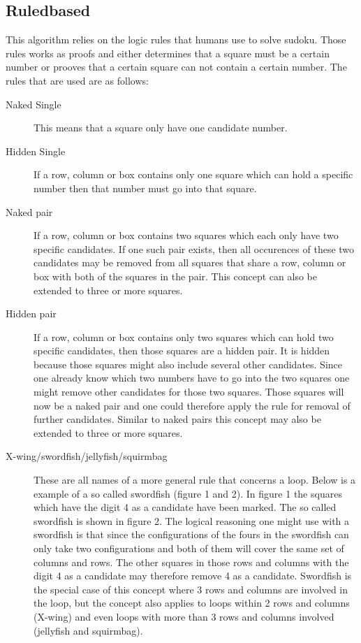 \documentclass[a4paper,11pt]{kth-mag}
\begin{document}
\subsection{Ruledbased}
This algorithm relies on the logic rules that humans use to solve sudoku. Those rules works as proofs and either determines that a square must be a certain number or prooves that a certain square can not contain a certain number. The rules that are used are as follows:
\begin{description}
    \item[Naked Single] 
    This means that a square only have one candidate number.
    \item[Hidden Single] 
    If a row, column or box contains only one square which can hold a specific number then that number must go into that square.
    \item[Naked pair] 
    If a row, column or box contains two squares which each only have two specific candidates. If one such pair exists, then all occurences of these two candidates may be removed from all squares that share a row, column or box with both of the squares in the pair. This concept can also be extended to three or more squares.
    \item[Hidden pair]
    If a row, column or box contains only two squares which can hold two specific candidates, then those squares are a hidden pair. It is hidden because those squares might also include several other candidates. Since one already know which two numbers have to go into the two squares one might remove other candidates for those two squares. Those squares will now be a naked pair and one could therefore apply the rule for removal of further candidates. Similar to naked pairs this concept may also be extended to three or more squares.

    \item[X-wing/swordfish/jellyfish/squirmbag]
    These are all names of a more general rule that concerns a loop. Below is a example of a so called swordfish (figure 1 and 2). In figure 1 the squares which have the digit 4 as a candidate have been marked. The so called swordfish is shown in figure 2. The logical reasoning one might use with a swordfish is that since the configurations of the fours in the swordfish can only take two configurations and both of them will cover the same set of columns and rows. The other squares in those rows and columns with the digit 4 as a candidate may therefore remove 4 as a candidate. Swordfish is the special case of this concept where 3 rows and columns are involved in the loop, but the concept also applies to loops within 2 rows and columns (X-wing) and even loops with more than 3 rows and columns involved (jellyfish and squirmbag).


\end{description}
\end{document}
